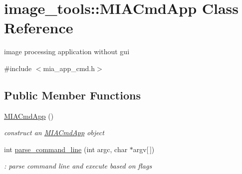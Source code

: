 \hypertarget{classimage__tools_1_1MIACmdApp}{}\section{image\+\_\+tools\+:\+:M\+I\+A\+Cmd\+App Class Reference}
\label{classimage__tools_1_1MIACmdApp}


image processing application without gui  




{\ttfamily \#include $<$mia\+\_\+app\+\_\+cmd.\+h$>$}

\subsection*{Public Member Functions}
\begin{DoxyCompactItemize}
\item 
\hyperlink{classimage__tools_1_1MIACmdApp_a24424ebe39fb3f9c3dc9f113697212fa}{M\+I\+A\+Cmd\+App} ()\hypertarget{classimage__tools_1_1MIACmdApp_a24424ebe39fb3f9c3dc9f113697212fa}{}\label{classimage__tools_1_1MIACmdApp_a24424ebe39fb3f9c3dc9f113697212fa}

\begin{DoxyCompactList}\small\item\em construct an \hyperlink{classimage__tools_1_1MIACmdApp}{M\+I\+A\+Cmd\+App} object \end{DoxyCompactList}\item 
int \hyperlink{classimage__tools_1_1MIACmdApp_ab5788e29212e4010921ac67ba83af38b}{parse\+\_\+command\+\_\+line} (int argc, char $\ast$argv\mbox{[}$\,$\mbox{]})
\begin{DoxyCompactList}\small\item\em \+: parse command line and execute based on flags \end{DoxyCompactList}\end{DoxyCompactItemize}
